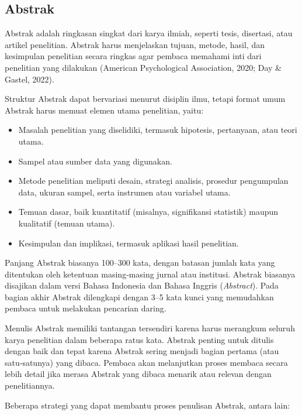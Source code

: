 \documentclass[
  indonesian,
  letterpaper,
  DIV=11,
  numbers=noendperiod]{scrreprt}
\providecommand{\tightlist}{%
  \setlength{\itemsep}{0pt}\setlength{\parskip}{0pt}}
\begin{document}
\subsection{Abstrak}\label{abstrak}

Abstrak adalah ringkasan singkat dari karya ilmiah, seperti tesis,
disertasi, atau artikel penelitian. Abstrak harus menjelaskan tujuan,
metode, hasil, dan kesimpulan penelitian secara ringkas agar pembaca
memahami inti dari penelitian yang dilakukan (American Psychological
Association, 2020; Day \& Gastel, 2022).

Struktur Abstrak dapat bervariasi menurut disiplin ilmu, tetapi format
umum Abstrak harus memuat elemen utama penelitian, yaitu:

\begin{itemize}
\tightlist
\item
  Masalah penelitian yang diselidiki, termasuk hipotesis, pertanyaan,
  atau teori utama.
\item
  Sampel atau sumber data yang digunakan.
\item
  Metode penelitian meliputi desain, strategi analisis, prosedur
  pengumpulan data, ukuran sampel, serta instrumen atau variabel utama.
\item
  Temuan dasar, baik kuantitatif (misalnya, signifikansi statistik)
  maupun kualitatif (temuan utama).
\item
  Kesimpulan dan implikasi, termasuk aplikasi hasil penelitian.
\end{itemize}

Panjang Abstrak biasanya 100--300 kata, dengan batasan jumlah kata yang
ditentukan oleh ketentuan masing‑masing jurnal atau institusi. Abstrak
biasanya disajikan dalam versi Bahasa Indonesia dan Bahasa Inggris
(\emph{Abstract}). Pada bagian akhir Abstrak dilengkapi dengan 3--5 kata
kunci yang memudahkan pembaca untuk melakukan pencarian daring.

Menulis Abstrak memiliki tantangan tersendiri karena harus merangkum
seluruh karya penelitian dalam beberapa ratus kata. Abstrak penting
untuk ditulis dengan baik dan tepat karena Abstrak sering menjadi bagian
pertama (atau satu‑satunya) yang dibaca. Pembaca akan melanjutkan proses
membaca secara lebih detail jika merasa Abstrak yang dibaca menarik atau
relevan dengan penelitiannya.

Beberapa strategi yang dapat membantu proses penulisan Abstrak, antara
lain:
\end{document}
